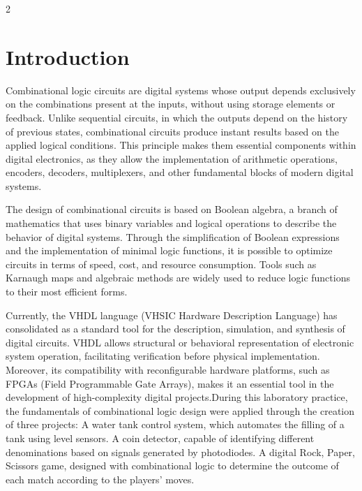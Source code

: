\documentclass{article}
\begin{document}
\begin{multicols}{2} %
\section{Introduction}\label{Intro}  
Combinational logic circuits are digital systems whose output depends exclusively on the combinations present at the inputs, without using storage elements or feedback. Unlike sequential circuits, in which the outputs depend on the history of previous states, combinational circuits produce instant results based on the applied logical conditions. This principle makes them essential components within digital electronics, as they allow the implementation of arithmetic operations, encoders, decoders, multiplexers, and other fundamental blocks of modern digital systems. 

The design of combinational circuits is based on Boolean algebra, a branch of mathematics that uses binary variables and logical operations to describe the behavior of digital systems. Through the simplification of Boolean expressions and the implementation of minimal logic functions, it is possible to optimize circuits in terms of speed, cost, and resource consumption. Tools such as Karnaugh maps and algebraic methods are widely used to reduce logic functions to their most efficient forms. 

Currently, the VHDL language (VHSIC Hardware Description Language) has consolidated as a standard tool for the description, simulation, and synthesis of digital circuits. VHDL allows structural or behavioral representation of electronic system operation, facilitating verification before physical implementation. Moreover, its compatibility with reconfigurable hardware platforms, such as FPGAs (Field Programmable Gate Arrays), makes it an essential tool in the development of high-complexity digital projects.During this laboratory practice, the fundamentals of combinational logic design were applied through the creation of three projects: 
A water tank control system, which automates the filling of a tank using level sensors. 
A coin detector, capable of identifying different denominations based on signals generated by photodiodes. 
A digital Rock, Paper, Scissors game, designed with combinational logic to determine the outcome of each match according to the players’ moves. 


\end{multicols}
\end{document}
